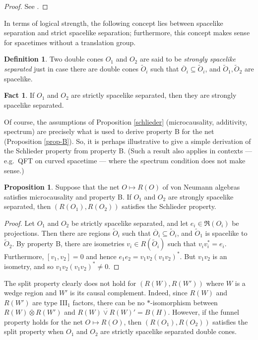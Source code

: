 \documentclass[11pt]{article}
\theoremstyle{definition}
\newtheorem{fact}[thm]{Fact}
\newtheorem{prop}[thm]{Proposition}
\theoremstyle{definition}
\newtheorem{defn}[thm]{Definition}
\theoremstyle{remark}
\def\wt#1{{\tilde #1}}
\def\ol#1{{\overline #1}}
\def\al#1{{\mathfrak #1}}
\begin{document}
\begin{proof} See \cite{schlied}. \end{proof}

In terms of logical strength, the following concept lies between
spacelike separation and strict spacelike separation; furthermore,
this concept makes sense for spacetimes without a translation group.

\begin{defn} Two double cones $O_1$ and $O_2$ are said to be
  \emph{strongly spacelike separated} just in case there are double
  cones $\wt O_i$ such that $\ol O_i\subseteq \wt O_i$, and $\wt
  O_1,\wt O_2$ are spacelike.  \end{defn}

\begin{fact} If $O_1$ and $O_2$ are strictly spacelike separated, then
  they are strongly spacelike separated.  \end{fact}

Of course, the assumptions of Proposition \ref{schlieder}
(microcausality, additivity, spectrum) are precisely what is used to
derive property B for the net (Proposition \ref{prop-B}).  So, it is
perhaps illustrative to give a simple derivation of the Schlieder
property from property B.  (Such a result also applies in contexts ---
e.g.\ QFT on curved spacetime --- where the spectrum condition does
not make sense.)

\begin{prop} Suppose that the net $O\mapsto R(O)$ of von Neumann
  algebras satisfies microcausality and property B.  If $O_1$ and
  $O_2$ are strongly spacelike separated, then $(R(O_1),R(O_2))$
  satisfies the Schlieder property.
  \label{frees}
\end{prop}

\begin{proof} Let $O_1$ and $O_2$ be strictly spacelike separated, and
  let $e_i\in \al R (O_i)$ be projections.  Then there are regions
  $\wt O_i$ such that $\ol O_i\subseteq \wt O_i$, and $\wt O_1$ is
  spacelike to $\wt O_2$.  By property B, there are isometries $v_i\in
  R(\wt O_i)$ such that $v_iv_i^*=e_i$.  Furthermore, $[v_1,v_2]=0$
  and hence $e_1e_2=v_1v_2(v_1v_2)^*$.  But $v_1v_2$ is an isometry,
  and so $v_1v_2(v_1v_2)^*\neq 0$.
\end{proof}

The split property clearly does not hold for
$(R(W),R(W'))$ where $W$ is a wedge region and $W'$ is
its causal complement.  Indeed, since $R(W)$ and
$R(W')$ are type III$_1$ factors, there can be no
$*$-isomorphism between $R(W)\overline{\otimes}R(W')$
and $\overline{R(W)\vee R(W)'}=B(H)$.  However, if the
funnel property holds for the net $O\mapsto R(O)$, then
$(R(O_1),R(O_2))$ satisfies the split property when
$O_1$ and $O_2$ are strictly spacelike separated double
cones.
\end{document}
